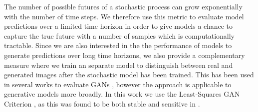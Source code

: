 \documentclass{article}
\begin{document}
The number of possible futures of a stochastic process can grow exponentially with the number of time steps.
We therefore use this metric to evaluate model predictions over a limited time horizon in order to give models a chance to capture the true future with a number of samples which is computationally tractable.
Since we are also interested in the the performance of models to generate predictions over long time horizons, we also provide a complementary measure where we train an separate model to distinguish between real and generated images after the stochastic model has been trained. This has been used in several works to evaluate GANs \citep{Danihelka17, Rosca17, GANeval}, however the approach is applicable to generative models more broadly. In this work we use the Least-Squares GAN Criterion \citep{Mao16}, as this was found to be both stable and sensitive in \citep{GANeval}.
\end{document}

